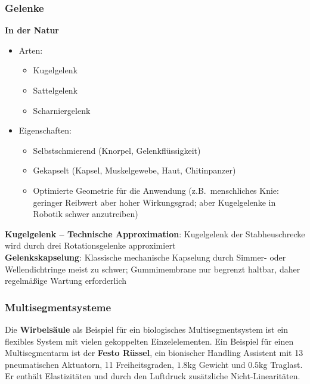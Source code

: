 \subsubsection{Gelenke}
\textbf{In der Natur}
\begin{itemize}
	\item Arten:
	\begin{itemize}
		\item Kugelgelenk
		\item Sattelgelenk
		\item Scharniergelenk
	\end{itemize}
	\item Eigenschaften:
	\begin{itemize}
		\item Selbstschmierend (Knorpel, Gelenkflüssigkeit)
		\item Gekapselt (Kapsel, Muskelgewebe, Haut, Chitinpanzer)
		\item Optimierte Geometrie für die Anwendung (z.B.\ menschliches Knie: geringer Reibwert aber hoher Wirkungsgrad; aber Kugelgelenke in Robotik schwer anzutreiben)
	\end{itemize}
\end{itemize}
\textbf{Kugelgelenk -- Technische Approximation}:
Kugelgelenk der Stabheuschrecke wird durch drei Rotationsgelenke approximiert \\
\textbf{Gelenkskapselung}: Klassische mechanische Kapselung durch Simmer- oder Wellendichtringe meist zu schwer; Gummimembrane nur begrenzt haltbar, daher regelmäßige Wartung erforderlich

\subsubsection{Multisegmentsysteme}
Die \textbf{Wirbelsäule} als Beispiel für ein biologisches Multisegmentsystem ist ein flexibles System mit vielen gekoppelten Einzelelementen.
Ein Beispiel für einen Multisegmentarm ist der \textbf{Festo Rüssel}, ein bionischer Handling Assistent mit 13 pneumatischen Aktuatorn, 11 Freiheitsgraden, $1.8$kg Gewicht und $0.5$kg Traglast.
Er enthält Elastizitäten und durch den Luftdruck zusätzliche Nicht-Linearitäten.

